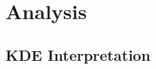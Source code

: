 \documentclass[sigconf]{acmart}
\begin{document}
\section{Analysis}
\label{sec:analysis}

\subsection{KDE Interpretation}
\label{sec:kde-interpretation}
\end{document}
